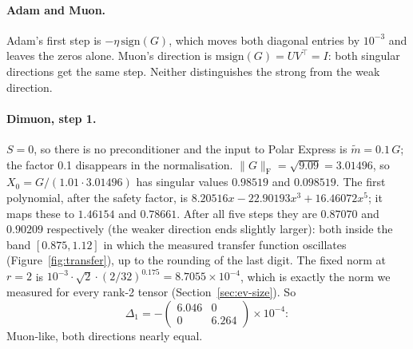 \documentclass[11pt]{article}
\newcommand{\fro}{\mathrm{F}}
\newcommand{\msign}{\mathrm{msign}}
\begin{document}
\paragraph{Adam and Muon.} Adam's first step is $-\eta\,\mathrm{sign}(G)$, which moves both diagonal
entries by $10^{-3}$ and leaves the zeros alone. Muon's direction is $\msign(G)=UV^\top=I$: both
singular directions get the same step. Neither distinguishes the strong from the weak direction.

\paragraph{Dimuon, step 1.} $S=0$, so there is no preconditioner and the input to Polar Express is
$\tilde m=0.1\,G$; the factor 0.1 disappears in the normalisation. $\|G\|_\fro=\sqrt{9.09}=3.01496$,
so $X_0=G/(1.01\cdot3.01496)$ has singular values $0.98519$ and $0.098519$. The first polynomial,
after the safety factor, is $8.20516x-22.90193x^3+16.46072x^5$; it maps these to $1.46154$ and
$0.78661$. After all five steps they are $0.87070$ and $0.90209$ respectively (the weaker direction ends
slightly larger): both inside the band
$[0.875,1.12]$ in which the measured transfer function oscillates (Figure~\ref{fig:transfer}),
up to the rounding of the last digit. The fixed norm at $r=2$ is
$10^{-3}\cdot\sqrt2\cdot(2/32)^{0.175}=8.7055\times10^{-4}$, which is exactly the norm we measured
for every rank-2 tensor (Section~\ref{sec:ev-size}). So
\[
\Delta_1=-\begin{pmatrix}6.046&0\\0&6.264\end{pmatrix}\times10^{-4}:
\]
Muon-like, both directions nearly equal.
\end{document}
